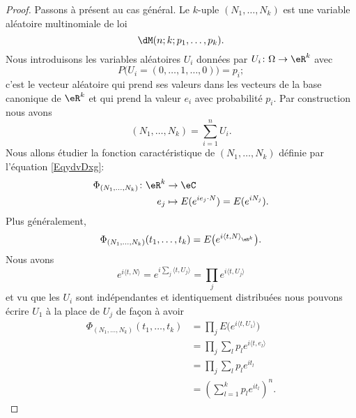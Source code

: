 \begin{proof}
	Passons à présent au cas général. Le \( k\)-uple \( (N_1,\ldots, N_k)\) est une variable aléatoire multinomiale de loi
	\begin{equation}
		\dM(n;k;p_1,\ldots, p_k).
	\end{equation}
	Nous introduisons les variables aléatoires \( U_i\) données par \( U_i\colon \Omega\to \eR^k\) avec
	\begin{equation}
		P\big( U_i=(0,\ldots, 1,\ldots, 0) \big)=p_i;
	\end{equation}
	c'est le vecteur aléatoire qui prend ses valeurs dans les vecteurs de la base canonique de \( \eR^k\) et qui prend la valeur \( e_i\) avec probabilité \( p_i\). Par construction nous avons
	\begin{equation}
		(N_1,\ldots, N_k)=\sum_{i=1}^nU_i.
	\end{equation}
	Nous allons étudier la fonction caractéristique de \( (N_1,\ldots, N_k)\) définie par l'équation \eqref{EqydvDxg}:
	\begin{equation}
		\begin{aligned}
			\Phi_{(N_1,\ldots, N_k)}\colon\eR^k & \to \eC                                   \\
			e_j                                 & \mapsto E( e^{ie_j\cdot N})=E( e^{iN_j}).
		\end{aligned}
	\end{equation}
	Plus généralement,
	\begin{equation}
		\Phi_{(N_1,\ldots, N_k)}(t_1,\ldots, t_k)=E\big(  e^{i\langle t, N\rangle_{\eR^k} } \big).
	\end{equation}
	Nous avons
	\begin{equation}
		e^{i\langle t, N\rangle }= e^{i\sum_j\langle t, U_j\rangle }=\prod_j e^{i\langle t, U_j\rangle }
	\end{equation}
	et vu que les \( U_i\) sont indépendantes et identiquement distribuées nous pouvons écrire \( U_1\) à la place de \( U_j\) de façon à avoir
	\begin{subequations}    \label{EqOhTHia}
		\begin{align}
			\Phi_{(N_1,\ldots, N_k)}(t_1,\ldots, t_k) & =\prod_{j}E\big(  e^{i\langle t, U_1\rangle } \big) \\
			                                          & =\prod_j\sum_lp_l e^{i\langle t, e_l\rangle }       \\
			                                          & =\prod_j\sum_lp_l e^{it_l}                          \\
			                                          & =\left( \sum_{l=1}^kp_l e^{it_l} \right)^n.

\end{align}
\end{subequations}
\end{proof}
